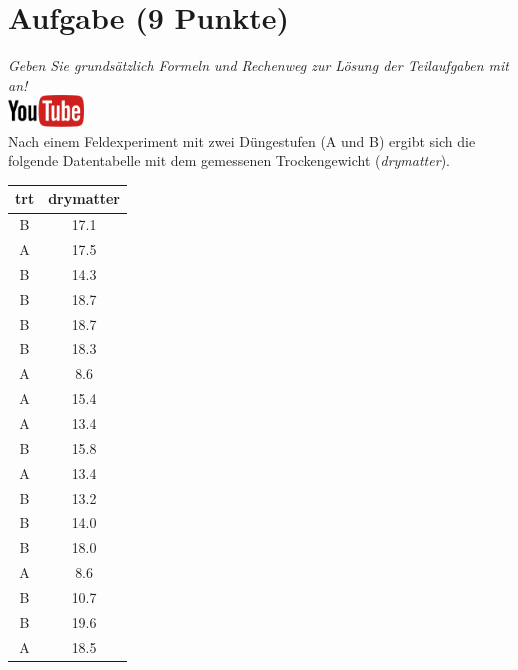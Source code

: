\documentclass[a4paper, 10pt]{scrartcl}\usepackage[]{graphicx}\usepackage[]{xcolor}
\begin{document}
 
\clearpage

\section{Aufgabe \hfill (9 Punkte)}

\textit{Geben Sie grunds{\"a}tzlich Formeln und Rechenweg zur L{\"o}sung der
  Teilaufgaben mit an!} \\[1Ex]

\hfill\href{https://youtu.be/0xc0jIPeiyw}{\includegraphics[width =
  2cm]{img/youtube}}\\[1Ex]


Nach einem Feldexperiment mit zwei D{\"u}ngestufen (A und B) ergibt sich die
folgende Datentabelle mit dem gemessenen Trockengewicht (\textit{drymatter}). 

\begin{table}[!h]
\centering
\begin{tabular}{cc}
\toprule
trt & drymatter\\
\midrule
B & 17.1\\
A & 17.5\\
B & 14.3\\
B & 18.7\\
B & 18.7\\
\addlinespace
B & 18.3\\
A & 8.6\\
A & 15.4\\
A & 13.4\\
B & 15.8\\
\addlinespace
A & 13.4\\
B & 13.2\\
B & 14.0\\
B & 18.0\\
A & 8.6\\
\addlinespace
B & 10.7\\
B & 19.6\\
A & 18.5\\
\bottomrule
\end{tabular}
\end{table}
\end{document}
